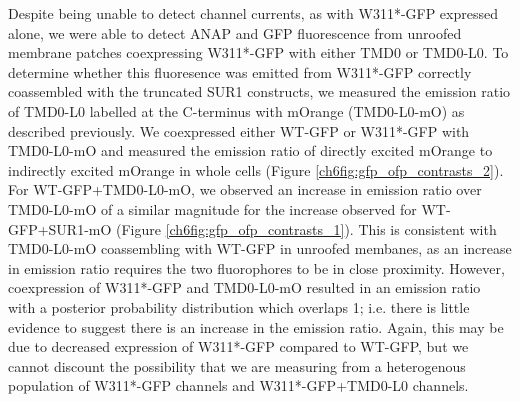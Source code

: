 Despite being unable to detect channel currents, as with W311*-GFP expressed alone, we were able to detect ANAP and GFP fluorescence from unroofed membrane patches coexpressing W311*-GFP with either TMD0 or TMD0-L0.
To determine whether this fluoresence was emitted from W311*-GFP correctly coassembled with the truncated SUR1 constructs, we measured the emission ratio of TMD0-L0 labelled at the C-terminus with mOrange (TMD0-L0-mO) as described previously.
We coexpressed either WT-GFP or W311*-GFP with TMD0-L0-mO and measured the emission ratio of directly excited mOrange to indirectly excited mOrange in whole cells (Figure \ref{ch6fig:gfp_ofp_contrasts_2}).
For WT-GFP+TMD0-L0-mO, we observed an increase in emission ratio over TMD0-L0-mO of a similar magnitude for the increase observed for WT-GFP+SUR1-mO (Figure \ref{ch6fig:gfp_ofp_contrasts_1}).
This is consistent with TMD0-L0-mO coassembling with WT-GFP in unroofed membanes, as an increase in emission ratio requires the two fluorophores to be in close proximity.
However, coexpression of W311*-GFP and TMD0-L0-mO resulted in an emission ratio with a posterior probability distribution which overlaps 1; i.e. there is little evidence to suggest there is an increase in the emission ratio.
Again, this may be due to decreased expression of W311*-GFP compared to WT-GFP, but we cannot discount the possibility that we are measuring from a heterogenous population of W311*-GFP channels and W311*-GFP+TMD0-L0 channels.

